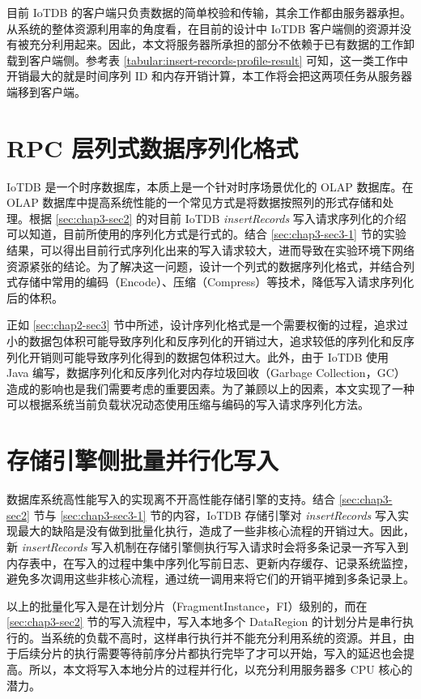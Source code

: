 目前 IoTDB 的客户端只负责数据的简单校验和传输，其余工作都由服务器承担。从系统的整体资源利用率的角度看，在目前的设计中 IoTDB 客户端侧的资源并没有被充分利用起来。因此，本文将服务器所承担的部分不依赖于已有数据的工作卸载到客户端侧。参考表 \ref{tabular:insert-records-profile-result} 可知，这一类工作中开销最大的就是时间序列 ID 和内存开销计算，本工作将会把这两项任务从服务器端移到客户端。

\section{RPC 层列式数据序列化格式}
IoTDB 是一个时序数据库，本质上是一个针对时序场景优化的 OLAP 数据库\cite{谭新宇2023一致性协议}。在 OLAP 数据库中提高系统性能的一个常见方式是将数据按照列的形式存储和处理。根据 \ref{sec:chap3-sec2} 的对目前 IoTDB \emph{insertRecords} 写入请求序列化的介绍可以知道，目前所使用的序列化方式是行式的。结合 \ref{sec:chap3-sec3-1} 节的实验结果，可以得出目前行式序列化出来的写入请求较大，进而导致在实验环境下网络资源紧张的结论。为了解决这一问题，设计一个列式的数据序列化格式，并结合列式存储中常用的编码（Encode）、压缩（Compress）等技术，降低写入请求序列化后的体积。

正如 \ref{sec:chap2-sec3} 节中所述，设计序列化格式是一个需要权衡的过程，追求过小的数据包体积可能导致序列化和反序列化的开销过大，追求较低的序列化和反序列化开销则可能导致序列化得到的数据包体积过大。此外，由于 IoTDB 使用 Java 编写，数据序列化和反序列化对内存垃圾回收（Garbage Collection，GC）造成的影响也是我们需要考虑的重要因素。为了兼顾以上的因素，本文实现了一种可以根据系统当前负载状况动态使用压缩与编码的写入请求序列化方法。

\section{存储引擎侧批量并行化写入}
数据库系统高性能写入的实现离不开高性能存储引擎的支持。结合 \ref{sec:chap3-sec2} 节与 \ref{sec:chap3-sec3-1} 节的内容，IoTDB 存储引擎对 \emph{insertRecords} 写入实现最大的缺陷是没有做到批量化执行，造成了一些非核心流程的开销过大。因此，新 \emph{insertRecords} 写入机制在存储引擎侧执行写入请求时会将多条记录一齐写入到内存表中，在写入的过程中集中序列化写前日志、更新内存缓存、记录系统监控，避免多次调用这些非核心流程，通过统一调用来将它们的开销平摊到多条记录上。

以上的批量化写入是在计划分片（FragmentInstance，FI）级别的，而在 \ref{sec:chap3-sec2} 节的写入流程中，写入本地多个 DataRegion 的计划分片是串行执行的。当系统的负载不高时，这样串行执行并不能充分利用系统的资源。并且，由于后续分片的执行需要等待前序分片都执行完毕了才可以开始，写入的延迟也会提高。所以，本文将写入本地分片的过程并行化，以充分利用服务器多 CPU 核心的潜力。

